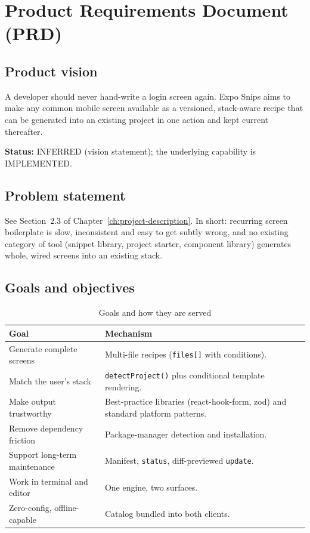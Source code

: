 \chapter{Product Requirements Document (PRD)}
\label{ch:prd}

\section{Product vision}

A developer should never hand-write a login screen again. Expo Snips aims to make
any common mobile screen available as a versioned, stack-aware recipe that can be
generated into an existing project in one action and kept current thereafter.

\textbf{Status:} INFERRED (vision statement); the underlying capability is
IMPLEMENTED.

\section{Problem statement}

See Section~2.3 of Chapter~\ref{ch:project-description}. In short: recurring
screen boilerplate is slow, inconsistent and easy to get subtly wrong, and no
existing category of tool (snippet library, project starter, component library)
generates whole, wired screens into an existing stack.

\section{Goals and objectives}

\begin{longtable}{p{6cm}p{8.6cm}}
\caption{Goals and how they are served}\\
\toprule
\textbf{Goal} & \textbf{Mechanism} \\
\midrule

Generate complete screens & Multi-file recipes (\texttt{files[]} with conditions). \\
Match the user's stack & \texttt{detectProject()} plus conditional template rendering. \\
Make output trustworthy & Best-practice libraries (react-hook-form, zod) and standard platform patterns. \\
Remove dependency friction & Package-manager detection and installation. \\
Support long-term maintenance & Manifest, \texttt{status}, diff-previewed \texttt{update}. \\
Work in terminal and editor & One engine, two surfaces. \\
Zero-config, offline-capable & Catalog bundled into both clients. \\
\bottomrule
\end{longtable}

